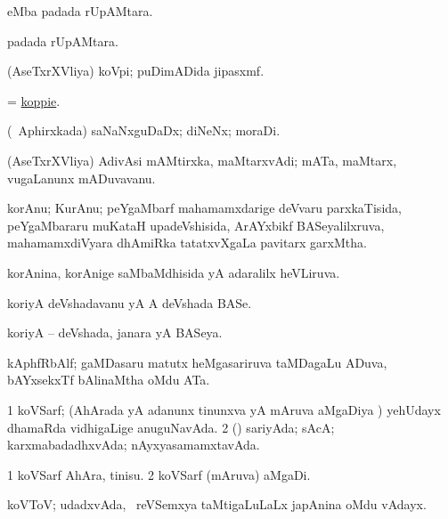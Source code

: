 \bentry
{}
\gl{\nA}
\bmng
{} eMba padada rUpAMtara. 
\emng
\eentry

\bentry
{}
\gl{\nA}
\bmng
{} padada rUpAMtara. 
\emng
\eentry

\bentry
{}
\gl{\nA}
\bmng
(AseTxrXVliya) koVpi; puDimADida jipasxmf. 
\emng
\eentry

\bentry
{}
\gl{\nA}
\bmng
 = \hyperlink{koppie}{koppie}. 
\emng
\eentry

\bentry
{}
\gl{\nA}
\bmng
(\da\ Aphirxkada) saNaNxguDaDx; diNeNx; moraDi. 
\emng
\eentry

\bentry
{}
\gl{\nA}
\bmng
(AseTxrXVliya) AdivAsi mAMtirxka, maMtarxvAdi; mATa, maMtarx, \mo vugaLanunx mADuvavanu. 
\emng
\eentry

\bentry
{}
\gl{\nA}
\bmng
korAnu; KurAnu; peYgaMbarf mahamamxdarige deVvaru parxkaTisida, peYgaMbararu muKataH upadeVshisida, ArAYxbikf BASeyalilxruva, mahamamxdiVyara dhAmiRka tatatxvXgaLa pavitarx garxMtha. 
\emng
\eentry

\bentry
{}
\gl{\gu}
\bmng
korAnina, korAnige saMbaMdhisida yA adaralilx heVLiruva. 
\emng
\eentry

\bentry
{}
\gl{\nA}
\bmng
koriyA deVshadavanu yA A deVshada BASe. 
\emng
\eentry

\bentry
{}
\gl{\gu}
\bmng
koriyA -- deVshada, janara yA BASeya. 
\emng
\eentry

\bentry
{}
\gl{\nA}
\bmng
kAphfRbAlf;  gaMDasaru matutx  heMgasariruva taMDagaLu ADuva, bAYxsekxTf bAlinaMtha oMdu ATa. 
\emng
\eentry

\bentry
{}
\gl{\gu}
\bmng
\bnum
\num{1} koVSarf; (AhArada yA adanunx tinunxva yA mAruva aMgaDiya \vi) yehUdayx dhamaRda vidhigaLige anuguNavAda. 
\num{2} (\AmA) sariyAda; sAcA; karxmabadadhxvAda; nAyxyasamamxtavAda. 
\enum
\emng
\eentry

\bentry
{}
\gl{\nA}
\bmng
\bnum
\num{1} koVSarf AhAra, tinisu. 
\num{2} koVSarf (mAruva) aMgaDi. 
\enum
\emng
\eentry

\bentry
{}
\gl{\nA}
\bmng
koVToV; udadxvAda, \kanmu\ reVSemxya  taMtigaLuLaLx japAnina oMdu vAdayx.   
\emng
\eentry

